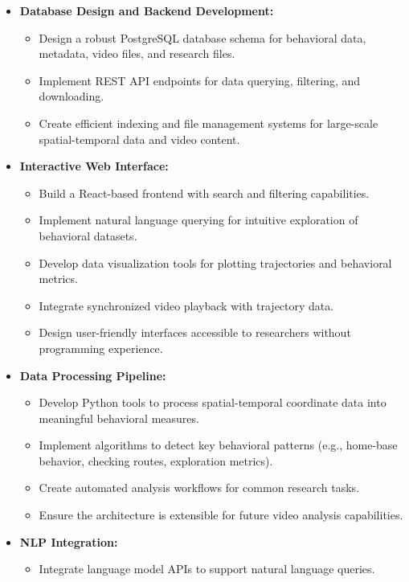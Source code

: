 \documentclass[12pt]{article}
\begin{document}
\begin{itemize}
    \item \textbf{Database Design and Backend Development:} 
        \begin{itemize}
            \item Design a robust PostgreSQL database schema for behavioral data, metadata, video files, and research files.
            \item Implement REST API endpoints for data querying, filtering, and downloading.
            \item Create efficient indexing and file management systems for large-scale spatial-temporal data and video content.
        \end{itemize}
        
    \item \textbf{Interactive Web Interface:} 
        \begin{itemize}
            \item Build a React-based frontend with search and filtering capabilities.
            \item Implement natural language querying for intuitive exploration of behavioral datasets.
            \item Develop data visualization tools for plotting trajectories and behavioral metrics.
            \item Integrate synchronized video playback with trajectory data.
            \item Design user-friendly interfaces accessible to researchers without programming experience.
        \end{itemize}
        
    \item \textbf{Data Processing Pipeline:} 
        \begin{itemize}
            \item Develop Python tools to process spatial-temporal coordinate data into meaningful behavioral measures.
            \item Implement algorithms to detect key behavioral patterns (e.g., home-base behavior, checking routes, exploration metrics).
            \item Create automated analysis workflows for common research tasks.
            \item Ensure the architecture is extensible for future video analysis capabilities.
        \end{itemize}
        
    \item \textbf{NLP Integration:} 
        \begin{itemize}
            \item Integrate language model APIs to support natural language queries.
        \end{itemize}
        

\end{itemize}
\end{document}
